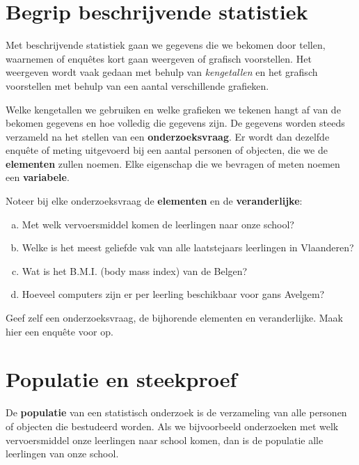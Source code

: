 \documentclass[12pt,twoside]{article}
\begin{document}
\section{Begrip beschrijvende statistiek}

Met beschrijvende statistiek gaan we gegevens die we bekomen door tellen, waarnemen of enquêtes kort gaan weergeven of grafisch voorstellen. Het weergeven wordt vaak gedaan met behulp van {\em kengetallen} en het grafisch voorstellen met behulp van een aantal verschillende grafieken.

Welke kengetallen we gebruiken en welke grafieken we tekenen hangt af van de bekomen gegevens en hoe volledig die gegevens zijn. De gegevens worden steeds verzameld na het stellen van een {\bf onderzoeksvraag}. Er wordt dan dezelfde enquête of meting uitgevoerd bij een aantal personen of objecten, die we de {\bf elementen} zullen noemen. Elke eigenschap die we bevragen of meten noemen een {\bf variabele}.

\begin{oefening}
Noteer bij elke onderzoeksvraag de {\bf elementen} en de {\bf veranderlijke}:
\begin{enumerate}[(a)]
  \item Met welk vervoersmiddel komen de leerlingen naar onze school?
  \item Welke is het meest geliefde vak van alle laatstejaars leerlingen in Vlaanderen?
  \item Wat is het B.M.I. (body mass index) van de Belgen?
  \item Hoeveel computers zijn er per leerling beschikbaar voor gans Avelgem?
\end{enumerate}
\end{oefening}

\begin{oefening}
Geef zelf een onderzoeksvraag, de bijhorende elementen en veranderlijke. Maak hier een enquête voor op.
\end{oefening}

\pagebreak
\section{Populatie en steekproef}

De {\bf populatie} van een statistisch onderzoek is de verzameling van alle personen of objecten die bestudeerd worden. Als we bijvoorbeeld onderzoeken met welk vervoersmiddel onze leerlingen naar school komen, dan is de populatie alle leerlingen van onze school.
\end{document}

